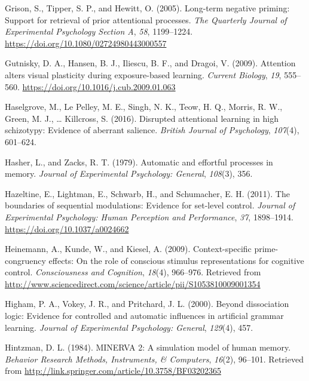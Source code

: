 \documentclass[]{DissertateCUNY}
\begin{document}
\leavevmode\hypertarget{ref-grison_long-term_2005}{}%
Grison, S., Tipper, S. P., and Hewitt, O. (2005). Long-term negative
priming: Support for retrieval of prior attentional processes. \emph{The
Quarterly Journal of Experimental Psychology Section A}, \emph{58},
1199--1224. \url{https://doi.org/10.1080/02724980443000557}

\leavevmode\hypertarget{ref-gutnisky_attention_2009}{}%
Gutnisky, D. A., Hansen, B. J., Iliescu, B. F., and Dragoi, V. (2009).
Attention alters visual plasticity during exposure-based learning.
\emph{Current Biology}, \emph{19}, 555--560.
\url{https://doi.org/10.1016/j.cub.2009.01.063}

\leavevmode\hypertarget{ref-haselgrove_disrupted_2016}{}%
Haselgrove, M., Le Pelley, M. E., Singh, N. K., Teow, H. Q., Morris, R.
W., Green, M. J., \ldots{} Killcross, S. (2016). Disrupted attentional
learning in high schizotypy: Evidence of aberrant salience.
\emph{British Journal of Psychology}, \emph{107}(4), 601--624.

\leavevmode\hypertarget{ref-hasher_automatic_1979}{}%
Hasher, L., and Zacks, R. T. (1979). Automatic and effortful processes
in memory. \emph{Journal of Experimental Psychology: General},
\emph{108}(3), 356.

\leavevmode\hypertarget{ref-hazeltine_boundaries_2011}{}%
Hazeltine, E., Lightman, E., Schwarb, H., and Schumacher, E. H. (2011).
The boundaries of sequential modulations: Evidence for set-level
control. \emph{Journal of Experimental Psychology: Human Perception and
Performance}, \emph{37}, 1898--1914.
\url{https://doi.org/10.1037/a0024662}

\leavevmode\hypertarget{ref-heinemann_context-specific_2009}{}%
Heinemann, A., Kunde, W., and Kiesel, A. (2009). Context-specific
prime-congruency effects: On the role of conscious stimulus
representations for cognitive control. \emph{Consciousness and
Cognition}, \emph{18}(4), 966--976. Retrieved from
\url{http://www.sciencedirect.com/science/article/pii/S1053810009001354}

\leavevmode\hypertarget{ref-higham_beyond_2000}{}%
Higham, P. A., Vokey, J. R., and Pritchard, J. L. (2000). Beyond
dissociation logic: Evidence for controlled and automatic influences in
artificial grammar learning. \emph{Journal of Experimental Psychology:
General}, \emph{129}(4), 457.

\leavevmode\hypertarget{ref-hintzman_minerva_1984}{}%
Hintzman, D. L. (1984). MINERVA 2: A simulation model of human memory.
\emph{Behavior Research Methods, Instruments, \& Computers},
\emph{16}(2), 96--101. Retrieved from
\url{http://link.springer.com/article/10.3758/BF03202365}
\end{document}
